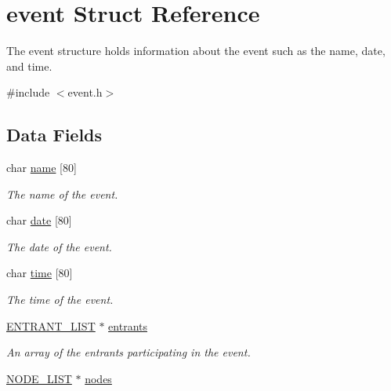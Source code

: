 \hypertarget{structevent}{\section{event Struct Reference}
\label{structevent}
}


The event structure holds information about the event such as the name, date, and time.  




{\ttfamily \#include $<$event.\-h$>$}

\subsection*{Data Fields}
{\bf }\par
\begin{DoxyCompactItemize}
\item 
char \hyperlink{structevent_a7c46e4f8536cfd63ebbdac5a258dc5dc}{name} \mbox{[}80\mbox{]}
\begin{DoxyCompactList}\small\item\em The name of the event. \end{DoxyCompactList}\item 
char \hyperlink{structevent_a83132208cc7419fd62d8c7cd93ba71bd}{date} \mbox{[}80\mbox{]}
\begin{DoxyCompactList}\small\item\em The date of the event. \end{DoxyCompactList}\item 
\hypertarget{structevent_a2b096ce628927ff2fa8ce151e210bc70}{char \hyperlink{structevent_a2b096ce628927ff2fa8ce151e210bc70}{time} \mbox{[}80\mbox{]}}\label{structevent_a2b096ce628927ff2fa8ce151e210bc70}

\begin{DoxyCompactList}\small\item\em The time of the event. \end{DoxyCompactList}\item 
\hyperlink{entrant_8h_a7eb199c35dfca7ae6b3269c34a298b4a}{E\-N\-T\-R\-A\-N\-T\-\_\-\-L\-I\-S\-T} $\ast$ \hyperlink{structevent_aa1a228481826b11e4fb1e898c4cad46b}{entrants}
\begin{DoxyCompactList}\small\item\em An array of the entrants participating in the event. \end{DoxyCompactList}\item 
\hypertarget{structevent_a74b445ee64e41219a0367adad894a7ba}{\hyperlink{node_8h_a12b8a06e01ee52ed252bc1b6179a8b0d}{N\-O\-D\-E\-\_\-\-L\-I\-S\-T} $\ast$ \hyperlink{structevent_a74b445ee64e41219a0367adad894a7ba}{nodes}}\label{structevent_a74b445ee64e41219a0367adad894a7ba}


\end{DoxyCompactItemize}
